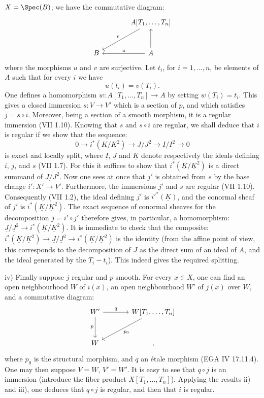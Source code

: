 %
$X=\Spec(B)$; we have the commutative diagram:
\[
\begin{tikzcd}[column sep=large,row sep=large]
& A[T_1,\ldots,T_n] \arrow[dl,"v"']\\
B & A \arrow[l,"u"'] \arrow[u]
\end{tikzcd}
\]
where the morphisms $u$ and $v$ are surjective. Let $t_i$, for $i=1,\ldots,n$, be elements of $A$ such that for every $i$ we have
\[
u(t_i)=v(T_i).
\]
One defines a homomorphism $w:A[T_1,\ldots,T_n]\longrightarrow A$ by setting $w(T_i)=t_i$. This gives a closed immersion $s:V\to V'$ which is a section of $p$, and which satisfies $j=s\circ i$. Moreover, being a section of a smooth morphism, it is a regular immersion (VII 1.10). Knowing that $s$ and $s\circ i$ are regular, we shall deduce that $i$ is regular if we show that the sequence:
\[
0\longrightarrow i^*(\underline{K}/\underline{K}^2)\longrightarrow \underline{J}/\underline{J}^2\longrightarrow \underline{I}/\underline{I}^2\longrightarrow0
\]
is exact and locally split, where $\underline{I}$, $\underline{J}$ and $\underline{K}$ denote respectively the ideals defining $i$, $j$, and $s$ (VII 1.7). For this it suffices to show that $i^*(\underline{K}/\underline{K}^2)$ is a direct summand of $\underline{J}/\underline{J}^2$. Now one sees at once that $j'$ is obtained from $s$ by the base change $i':X'\to V'$. Furthermore, the immersions $j'$ and $s$ are regular (VII 1.10). Consequently (VII 1.2), the ideal defining $j'$ is $i'^*(\underline{K})$, and the conormal sheaf of $j'$ is $i^*(\underline{K}/\underline{K}^2)$. The exact sequence of conormal sheaves for the decomposition $j=i'\circ j'$ therefore gives, in particular, a homomorphism: $\underline{J}/\underline{J}^2\longrightarrow i^*(\underline{K}/\underline{K}^2)$. It is immediate to check that the composite: $i^*(\underline{K}/\underline{K}^2)\longrightarrow \underline{J}/\underline{J}^2\longrightarrow i^*(\underline{K}/\underline{K}^2)$ is the identity (from the affine point of view, this corresponds to the decomposition of $J$ as the direct sum of an ideal of $A$, and the ideal generated by the $T_i-t_i$). This indeed gives the required splitting.

%
iv)
Finally suppose $j$ regular and $p$ smooth. For every $x\in X$, one can find an open neighbourhood $W$ of $i(x)$, an open neighbourhood $W'$ of $j(x)$ over $W$, and a commutative diagram:
\[
\begin{tikzcd}[column sep=large,row sep=large]
W' \arrow[r,"q"] \arrow[d,"p"'] & W[T_1,\ldots,T_n] \arrow[dl,"p_0"]\\
W & ,
\end{tikzcd}
\]
where $p_0$ is the structural morphism, and $q$ an étale morphism (EGA IV 17.11.4). One may then suppose $V=W$, $V'=W'$. It is easy to see that $q\circ j$ is an immersion (introduce the fiber product $X[T_1,\ldots,T_n]$). Applying the results ii) and iii), one deduces that $q\circ j$ is regular, and then that $i$ is regular.

